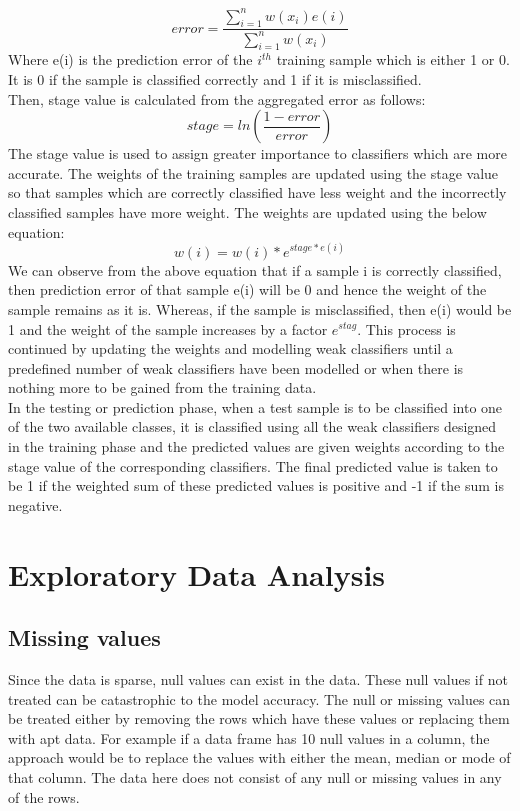 \documentclass[sigconf]{acmart}
\begin{document}
\begin{equation}
    error = \frac{\sum_{i=1}^{n}w(x_i)e(i)}{\sum_{i=1}^{n}w(x_i)}
\end{equation}
Where e(i) is the prediction error of the $i^{th}$ training sample which is either 1 or 0. It is 0 if the sample is classified correctly and 1 if it is misclassified. \\
Then, stage value is calculated from the aggregated error as follows:
\begin{equation}
    stage = ln(\frac{1-error}{error})
\end{equation}
The stage value is used to assign greater importance to classifiers which are more accurate. The weights of the training samples are updated using the stage value so that samples which are correctly classified have less weight and the incorrectly classified samples have more weight. The weights are updated using the below equation:
\begin{equation}
    w(i) = w(i)*e^{stage*e(i)}
\end{equation}
We can observe from the above equation that if a sample i is correctly classified, then prediction error of that sample e(i) will be 0 and hence the weight of the sample remains as it is. Whereas, if the sample is misclassified, then e(i) would be 1 and the weight of the sample increases by a factor $e^{stag}$. This process is continued by updating the weights and modelling weak classifiers until a predefined number of weak classifiers have been modelled or when there is nothing more to be gained from the training data.\\
In the testing or prediction phase, when a test sample is to be classified into one of the two available classes, it is classified using all the weak classifiers designed in the training phase and the predicted values are given weights according to the stage value of the corresponding classifiers. The final predicted value is taken to be 1 if the weighted sum of these predicted values is positive and -1  if the sum is negative.

\section{Exploratory Data Analysis}
\subsection{Missing values}
Since the data is sparse, null values can exist in the data. These null values if not treated can be catastrophic to the model accuracy. The null or missing values can be treated either by removing the rows which have these values or replacing them with apt data. For example if a data frame has 10 null values in a column, the approach would be to replace the values with either the mean, median or mode of that column.  The data here does not consist of any null or missing values in any of the rows.
\end{document}
